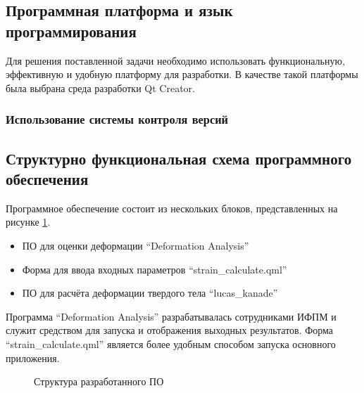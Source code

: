 \subsection {Программная платформа и язык программирования}
Для решения поставленной задачи необходимо использовать функциональную, эффективную и удобную платформу для разработки. В качестве такой платформы была выбрана среда разработки Qt Creator.

\subsubsection {Использование системы контроля версий}

\subsection{Структурно функциональная схема программного обеспечения}%

Программное обеспечение состоит из нескольких блоков, представленных на рисунке \ref{pic:shema_PO}.

\begin{itemize}
\item ПО для оценки деформации ``Deformation Analysis''
\item Форма для ввода входных параметров ``strain\_calculate.qml''
\item ПО для расчёта деформации твердого тела ``lucas\_kanade''
\end{itemize}

Программа ``Deformation Analysis'' разрабатывалась сотрудниками ИФПМ и служит средством для запуска и отображения выходных результатов. Форма ``strain\_calculate.qml'' является более удобным способом запуска основного приложения. 

\begin{figure}[ht]
\caption{Структура разработанного ПО}
\label{pic:shema_PO}
\end{figure}


